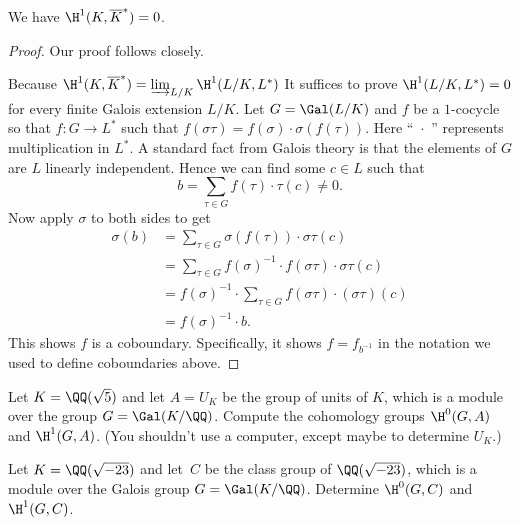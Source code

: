 \begin{theorem}[Hilbert 90]\label{thm:h90}
  We have $\H^1(K,\overline{K}^*) = 0$.
\end{theorem}
\begin{proof}
  Our proof follows \cite[pg.~150]{serre:localfields} closely.

  Because $\H^1(K,\overline{K}^*) = \varinjlim_{L/K} \H^1(L/K,L^*)$
  It suffices to prove $\H^1(L/K,L^*) = 0$ for every finite
  Galois extension $L/K$.
  Let $G = \Gal(L/K)$ and $f$ be a $1$-cocycle so that $f:G \to L^*$
  such that $f(\sigma\tau) = f(\sigma)\cdot\sigma(f(\tau))$. Here
  ``~$\cdot$~'' represents multiplication in $L^*$.
  A standard fact from Galois theory is that the elements of
  $G$ are $L$ linearly independent. Hence we can find
  some $c\in L$ such that
  \[
  b = \sum_{\tau\in G} f(\tau)\cdot\tau(c) \neq 0.
  \]
  Now apply $\sigma$ to both sides to get
  \begin{align*}
    \sigma(b)
    &=
    \sum_{\tau\in G} \sigma(f(\tau)) \cdot \sigma\tau(c)
    \\
    &=
    \sum_{\tau\in G} f(\sigma)^{-1} \cdot f(\sigma\tau)
    \cdot \sigma\tau(c)
    \\
    &=
    f(\sigma)^{-1} \cdot \sum_{\tau\in G} f(\sigma\tau)
    \cdot (\sigma\tau)(c)
    \\
    &=
    f(\sigma)^{-1}\cdot b.
  \end{align*}
  This shows $f$ is a coboundary. Specifically, it shows
  $f = f_{b^{-1}}$ in the notation we used to define
  coboundaries above.
\end{proof}

\begin{exercise}
  Let $K=\QQ(\sqrt{5})$ and let $A=U_K$ be the group of units of
  $K$, which is a module over the group $G=\Gal(K/\QQ)$.  Compute the
  cohomology groups $\H^0(G,A)$ and $\H^1(G,A)$.  (You shouldn't use
  a computer, except maybe to determine $U_K$.)
\end{exercise}

\begin{exercise}
  Let $K=\QQ(\sqrt{-23})$ and let~$C$ be the class group of
  $\QQ(\sqrt{-23})$, which is a module over the Galois group $G=\Gal(K/\QQ)$.
  Determine $\H^0(G,C)$ and $\H^1(G,C)$.
\end{exercise}
